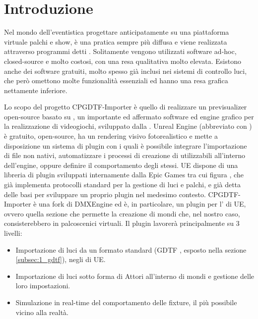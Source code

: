 \documentclass[main.tex]{subfiles}
\begin{document}
\sloppy


\vspace{1.0cm}

\section{Introduzione}\label{sec:Intro}
Nel mondo dell'eventistica progettare anticipatamente su una piattaforma virtuale palchi e show, è una pratica sempre più diffusa e viene realizzata attraverso programmi detti . Solitamente vengono utilizzati software\cite{capture} ad-hoc, closed-source e molto costosi, con una resa qualitativa molto elevata. Esistono anche dei software gratuiti, molto spesso già inclusi nei sistemi di controllo luci, che però omettono molte funzionalità essenziali ed hanno una resa grafica nettamente inferiore.\newline

Lo scopo del progetto CPGDTF-Importer è quello di realizzare un previsualizer open-source basato su \cite{UnrealEngine}, un importante ed affermato software ed engine grafico per la realizzazione di videogiochi, sviluppato dalla . Unreal Engine (abbreviato con ) è gratuito, open-source, ha un rendering visivo fotorealistico e mette a disposizione un sistema di plugin con i quali è possibile integrare l'importazione di file non nativi, automatizzare i processi di creazione di  utilizzabili all'interno dell'engine, oppure definire il comportamento degli stessi. UE dispone di una libreria di plugin sviluppati internamente dalla Epic Games tra cui figura , che già implementa protocolli standard per la gestione di luci e palchi, e già detta delle basi per sviluppare un proprio plugin nel medesimo contesto.  
\newline
CPGDTF-Importer è una fork di DMXEngine ed è, in particolare, un plugin per l' di UE, ovvero quella sezione che permette la creazione di mondi che, nel nostro caso, consisterebbero in palcoscenici virtuali. Il plugin lavorerà principalmente su 3 livelli:
\begin{itemize}
    \item Importazione di luci da un formato standard (GDTF \cite{GDTF}, esposto nella sezione \ref{subsec:1_gdtf}), negli  di UE.
    \item Importazione di luci sotto forma di Attori all'interno di mondi e gestione delle loro impostazioni.
    \item Simulazione in real-time del comportamento delle fixture, il più possibile vicino alla realtà.
\end{itemize}
\end{document}
